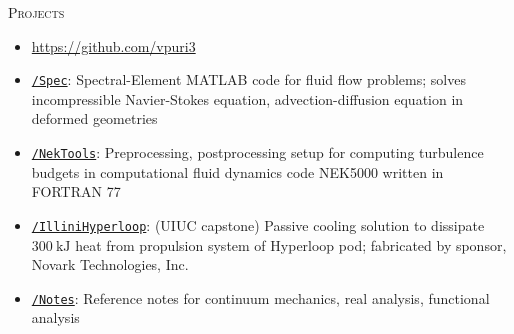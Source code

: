 \documentclass[10pt]{article}
\begin{document}
\begin{multicols}{2}
\textsc{Projects}
\columnbreak

\vspace{-1.75em}
\begin{itemize}[label=-]
    \setlength{\itemindent}{-1.50em}
    \setlength\itemsep{-0.25em}
    \item[]\hspace{-0.90em}\url{https://github.com/vpuri3}
    \item \href{https://github.com/vpuri3/Spec}{\texttt{/Spec}}: Spectral-Element MATLAB code for fluid flow problems; solves incompressible Navier-Stokes equation, advection-diffusion equation in deformed geometries
    \item \href{https://github.com/vpuri3/NekTools}{\texttt{/NekTools}}: Preprocessing, postprocessing setup for computing turbulence budgets in computational fluid dynamics code {NEK5000} written in FORTRAN 77
    \item \href{https://github.com/vpuri3/IlliniHyperloop}{\texttt{/IlliniHyperloop}}: (UIUC capstone) Passive cooling solution to dissipate $\SI{300}{\kilo \joule}$ heat from propulsion system of Hyperloop pod; fabricated by sponsor, Novark Technologies, Inc.
    \item \href{https://github.com/vpuri3/Notes}{\texttt{/Notes}}: Reference notes for continuum mechanics, real analysis, functional analysis
\end{itemize}
\vspace{-2.0em}

\end{multicols}
\vspace{-1.5em}
\vfill
\end{document}
